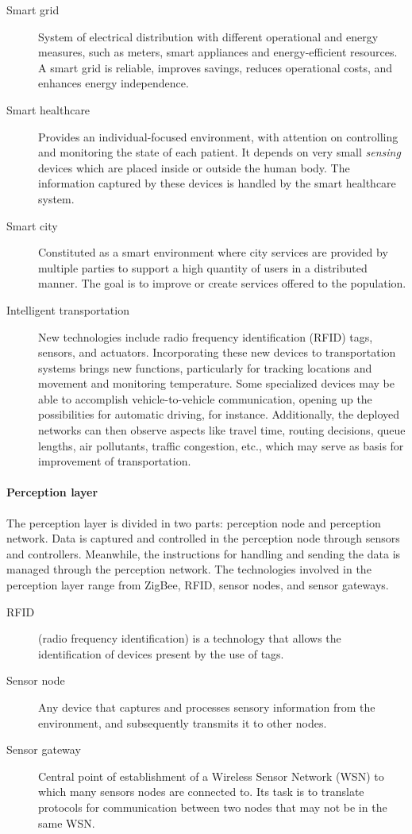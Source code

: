 \documentclass[12pt]{article}
\begin{document}
\begin{description}
\item [Smart grid] System of electrical distribution with different operational and energy measures, such as meters, smart appliances and energy-efficient resources. A smart grid is reliable, improves savings, reduces operational costs, and enhances energy independence. 
\item [Smart healthcare] Provides an individual-focused environment, with attention on controlling and monitoring the state of each patient. It depends on very small \emph{sensing} devices which are placed inside or outside the human body. The information captured by these devices is handled by the smart healthcare system.
\item [Smart city] Constituted as a smart environment where city services are provided by multiple parties to support a high quantity of users in a distributed manner. The goal is to improve or create services offered to the population.
\item [Intelligent transportation] New technologies include radio frequency identification (RFID) tags, sensors, and actuators. Incorporating these new devices to transportation systems brings new functions, particularly for tracking locations and movement and monitoring temperature. Some specialized devices may be able to accomplish vehicle-to-vehicle communication, opening up the possibilities for automatic driving, for instance. Additionally, the deployed networks can then observe aspects like travel time, routing decisions, queue lengths, air pollutants, traffic congestion, etc., which may serve as basis for improvement of transportation.
\end{description}

\paragraph{Perception layer} The perception layer is divided in two parts: perception node and perception network. Data is captured and controlled in the perception node through sensors and controllers. Meanwhile, the instructions for handling and sending the data is managed through the perception network. The technologies involved in the perception layer range from ZigBee, RFID, sensor nodes, and sensor gateways.

\begin{description}
\item [RFID] (radio frequency identification) is a technology that allows the identification of devices present by the use of tags. 
\item [Sensor node] Any device that captures and processes sensory information from the environment, and subsequently transmits it to other nodes.
\item [Sensor gateway] Central point of establishment of a Wireless Sensor Network (WSN) to which many sensors nodes are connected to. Its task is to translate protocols for communication between two nodes that may not be in the same WSN.
\end{description}
\end{document}
